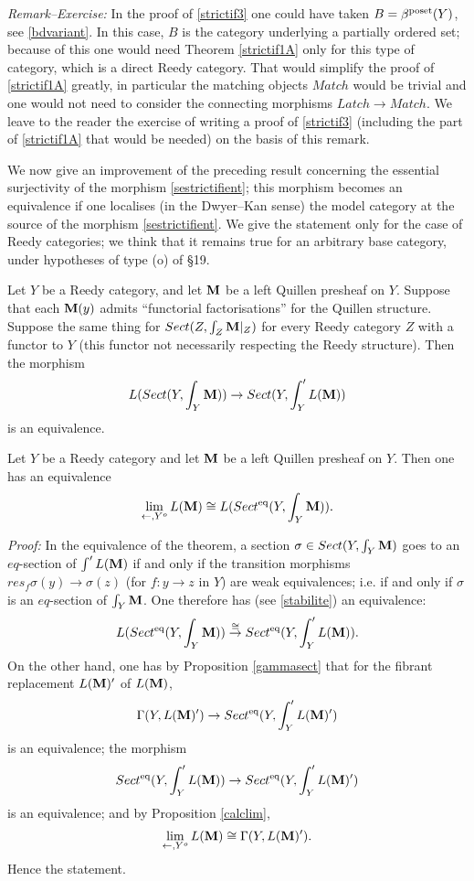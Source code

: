 {\em Remark--Exercise:}
\newline
In the proof of \ref{strictif3} one
could have
taken $B=\beta ^{\rm poset}(Y)$, see \ref{bdvariant}. In this case,
$B$ is the category underlying a partially ordered set;
because of this one would need Theorem \ref{strictif1A} only for this
type of category, which is a direct Reedy category. That
would simplify the proof of \ref{strictif1A} greatly, in particular
the matching objects $Match$ would be trivial and one would not need to
consider the connecting morphisms $Latch\rightarrow Match$. We leave to the
reader the exercise of writing a proof of \ref{strictif3}
(including the part of \ref{strictif1A} that would be needed) on the basis of
this remark.





We now give an improvement of the preceding result
concerning
the essential surjectivity of the morphism \ref{sestrictifient}; this
morphism becomes an
equivalence if one localises (in the Dwyer--Kan sense) the model category
at the source of the morphism \ref{sestrictifient}. We give the statement
only for the case of
Reedy categories; we think that it remains true for an arbitrary base
category, under
hypotheses of type (o) of \S 19.

\begin{theorem}
\label{uneequivalence}
Let $Y$ be a Reedy category, and let ${\bf M}$ be a left Quillen presheaf
on $Y$. Suppose that each ${\bf M} (y)$ admits ``functorial
factorisations'' for the Quillen structure. Suppose the same thing for
$Sect (Z,\int _Z{\bf M} |_Z)$ for every Reedy category $Z$ with a functor
to $Y$ (this functor not necessarily respecting the Reedy structure).
Then the
morphism
$$
L(Sect (Y,\int _Y{\bf M} ))\rightarrow Sect (Y,\int '_YL({\bf M} ))
$$
is an equivalence.
\end{theorem}

\begin{corollary}
\label{pqcalclim}
Let $Y$ be a Reedy category and let ${\bf M}$ be a left Quillen presheaf
on $Y$. Then one has an equivalence
$$
\lim _{\leftarrow , Y^o}L({\bf M} )\cong L(Sect ^{\rm eq}(Y,\int _Y{\bf M} )).
$$
\end{corollary}
{\em Proof:}
In the equivalence of the theorem, a section $\sigma \in Sect (Y,\int _Y{\bf M}
)$ goes to an $eq$-section of $\int 'L({\bf M} )$ if and only if the transition
morphisms $res_f\sigma (y)\rightarrow \sigma (z)$ (for $f:y\rightarrow z$
in $Y$) are weak equivalences; i.e. if and only if $\sigma$ is
an $eq$-section of $\int _Y{\bf M}$. One therefore has (see \ref{stabilite}) an
equivalence:
$$
L(Sect ^{\rm eq}(Y,\int _Y{\bf M} ))
\stackrel{\cong}{\rightarrow} Sect ^{\rm eq}(Y,\int '_YL({\bf M} )).
$$
On the other hand, one has by Proposition \ref{gammasect} that for the fibrant
replacement $L({\bf M} )'$ of $L({\bf M} )$,
$$
\Gamma (Y, L({\bf M} )')\rightarrow
Sect ^{\rm eq}(Y,\int '_YL({\bf M} )')
$$
is an equivalence; the morphism
$$
Sect ^{\rm eq}(Y,\int '_YL({\bf M} ))\rightarrow Sect ^{\rm eq}(Y,\int '_YL({\bf M} )')
$$
is an equivalence; and by Proposition \ref{calclim},
$$
\lim _{\leftarrow , Y^o}L({\bf M} ) \cong \Gamma (Y, L({\bf M} )').
$$
Hence the statement.
\eop

